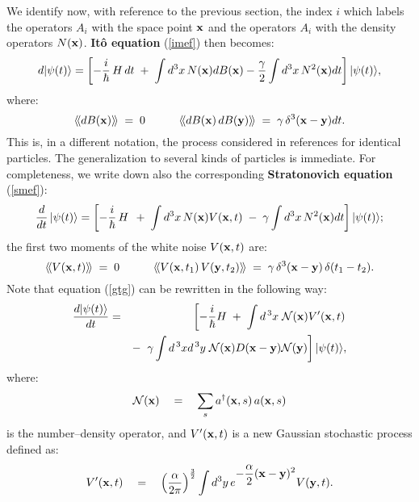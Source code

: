 \documentclass[10pt,a4paper]{article}
\newcommand{\llangle}{\langle\!\langle}
\newcommand{\rrangle}{\rangle\!\rangle}
\begin{document}
We identify now, with reference to the previous section, the index
$i$ which labels the operators $A_i$ with the space point ${\bf
x}$ and the operators $A_{i}$ with the density operators $N({\bf
x})$. {\bf It\^o equation} (\ref{imef}) then becomes:
\begin{equation} \label{iecsl}
d |\psi(t) \rangle = \left[ -\frac{i}{\hbar}\, H\, dt \; + \; \int
d^3 x \, N({\bf x}) dB({\bf x}) - \frac{\gamma}{2} \int d^3 x \,
N^2({\bf x}) dt \right] | \psi(t) \rangle,
\end{equation}
where:
\begin{equation}
\llangle dB({\bf x})\rrangle \; = \; 0 \qquad\quad \llangle
dB({\bf x})\,dB({\bf y})\rrangle \; = \;  \gamma \, \delta^3({\bf
x} - {\bf y}) dt.
\end{equation}
This is, in a different notation, the process considered in
references \cite{csl0,csl}  for identical particles. The
generalization to several kinds of particles is immediate. For
completeness, we write down also the corresponding {\bf
Stratonovich equation} (\ref{smef}):
\begin{equation} \label{gtg}
\frac{d}{dt}\, |\psi(t) \rangle = \left[ -\frac{i}{\hbar}\, H\, \;
+ \; \int d^3 x \, N({\bf x}) V({\bf x}, t) \; - \; \gamma \int
d^3  x \, N^2({\bf x}) dt \right] | \psi(t) \rangle;
\end{equation}
the first two moments of the white noise $V({\bf x}, t)$ are:
\begin{equation} \label{sch1d2}
\llangle V({\bf x}, t)\rrangle \; = \; 0 \qquad\quad \llangle
V({\bf x}, t_{1})\, V({\bf y}, t_{2})\rrangle \; = \;  \gamma \,
\delta^3({\bf x} - {\bf y})\, \delta (t_{1} - t_{2}).
\end{equation}
Note that equation (\ref{gtg}) can be rewritten in the following
way:
\begin{eqnarray} \label{sch1d}
\frac{d|\psi(t)\rangle}{dt} & = & \left[ -\frac{i}{\hbar} H\; +\;
\int d^{\,3}x\; {\mathcal N}({\bf x}) V'({\bf x},t) \right.
\nonumber \\
& & - \; \left.\gamma \int d^{\,3}x d^{\,3}y \; {\mathcal N}({\bf
x}) D({\bf x} - {\bf y}) {\mathcal N}({\bf y}) \right]
|\psi(t)\rangle,
\end{eqnarray}
where:
\begin{equation}
{\mathcal N}({\bf x}) \quad = \quad \sum_{s} a^{\dagger}({\bf x},
s)\,a({\bf x}, s)
\end{equation}
is the number--density operator, and $V'({\bf x},t)$ is a new
Gaussian stochastic process defined as:
\begin{equation} \label{nsf}
V'({\bf x}, t) \quad = \quad
\left(\frac{\alpha}{2\pi}\right)^{\frac{3}{2}} \int d^{3}y\,
e^{\displaystyle -\frac{\alpha}{2}({\bf x} - {\bf y})^{2}} V({\bf
y}, t).
\end{equation}
\end{document}
